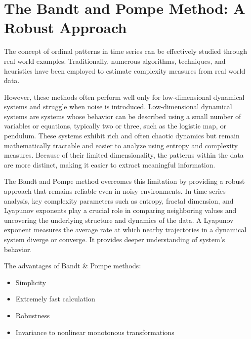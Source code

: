 \section{The Bandt and Pompe Method: A Robust Approach} \label{Sec:BP method}

The concept of ordinal patterns in time series can be effectively studied through real world examples. 
Traditionally, numerous algorithms, techniques, and heuristics have been employed to estimate complexity measures from real world data. 

However, these methods often perform well only for low-dimensional dynamical systems and struggle when noise is introduced. Low-dimensional dynamical systems are systems whose behavior can be described using a small number of variables or equations, typically two or three, such as the logistic map, or pendulum. These systems exhibit rich and often chaotic dynamics but remain mathematically tractable and easier to analyze using entropy and complexity measures. Because of their limited dimensionality, the patterns within the data are more distinct, making it easier to extract meaningful information. 

The Bandt and Pompe method overcomes this limitation by providing a robust approach that remains reliable even in noisy environments. 
In time series analysis, key complexity parameters such as entropy, fractal dimension, 
and Lyapunov exponents play a crucial role in comparing neighboring values and uncovering the underlying structure and dynamics of the data. A Lyapunov exponent measures the average rate at which nearby trajectories in a dynamical system diverge or converge. It provides deeper understanding of system's behavior. 

The advantages of Bandt \& Pompe methods:
\begin{itemize}
	\item Simplicity
	\item Extremely fast calculation
	\item Robustness
	\item Invariance to nonlinear monotonous transformations
\end{itemize}	

